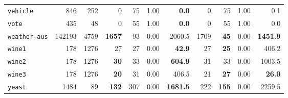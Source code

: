 \begin{tabular}{lccrrrrrrrr}
\texttt{vehicle} & \multicolumn{1}{r}{846} & \multicolumn{1}{r}{252}  & 0 & 75 & 1.00 & \textbf{0.0} & 0 & 75 & 1.00 & 0.1\\
\texttt{vote} & \multicolumn{1}{r}{435} & \multicolumn{1}{r}{48}  & 0 & 55 & 1.00 & \textbf{0.0} & 0 & 55 & 1.00 & 0.0\\
\texttt{weather-aus} & \multicolumn{1}{r}{142193} & \multicolumn{1}{r}{4759}  & \textbf{1657} & 93 & 0.00 & 2060.5 & 1709 & \textbf{45} & 0.00 & \textbf{1451.9}\\
\texttt{wine1} & \multicolumn{1}{r}{178} & \multicolumn{1}{r}{1276}  & 27 & 27 & 0.00 & \textbf{42.9} & 27 & \textbf{25} & 0.00 & 406.2\\
\texttt{wine2} & \multicolumn{1}{r}{178} & \multicolumn{1}{r}{1276}  & \textbf{30} & 33 & 0.00 & \textbf{604.9} & 31 & 33 & 0.00 & 1003.5\\
\texttt{wine3} & \multicolumn{1}{r}{178} & \multicolumn{1}{r}{1276}  & \textbf{20} & 31 & 0.00 & 406.5 & 21 & \textbf{27} & 0.00 & \textbf{26.0}\\
\texttt{yeast} & \multicolumn{1}{r}{1484} & \multicolumn{1}{r}{89}  & \textbf{132} & 307 & 0.00 & \textbf{1681.5} & 222 & \textbf{155} & 0.00 & 2259.5\\
\bottomrule
\end{tabular}
